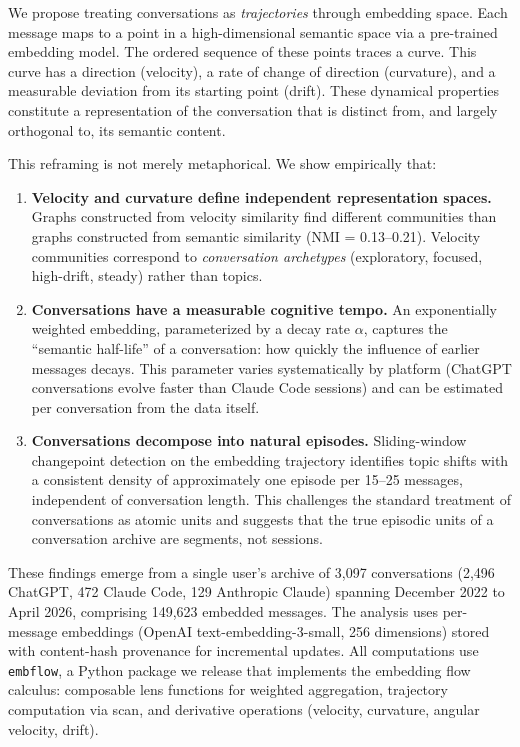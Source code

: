 \documentclass[11pt]{article}
\begin{document}
We propose treating conversations as \emph{trajectories} through embedding space. Each message maps to a point in a high-dimensional semantic space via a pre-trained embedding model. The ordered sequence of these points traces a curve. This curve has a direction (velocity), a rate of change of direction (curvature), and a measurable deviation from its starting point (drift). These dynamical properties constitute a representation of the conversation that is distinct from, and largely orthogonal to, its semantic content.

This reframing is not merely metaphorical. We show empirically that:

\begin{enumerate}
\item \textbf{Velocity and curvature define independent representation spaces.} Graphs constructed from velocity similarity find different communities than graphs constructed from semantic similarity (NMI = 0.13--0.21). Velocity communities correspond to \emph{conversation archetypes} (exploratory, focused, high-drift, steady) rather than topics.

\item \textbf{Conversations have a measurable cognitive tempo.} An exponentially weighted embedding, parameterized by a decay rate $\alpha$, captures the ``semantic half-life'' of a conversation: how quickly the influence of earlier messages decays. This parameter varies systematically by platform (ChatGPT conversations evolve faster than Claude Code sessions) and can be estimated per conversation from the data itself.

\item \textbf{Conversations decompose into natural episodes.} Sliding-window changepoint detection on the embedding trajectory identifies topic shifts with a consistent density of approximately one episode per 15--25 messages, independent of conversation length. This challenges the standard treatment of conversations as atomic units and suggests that the true episodic units of a conversation archive are segments, not sessions.
\end{enumerate}

These findings emerge from a single user's archive of 3,097 conversations (2,496 ChatGPT, 472 Claude Code, 129 Anthropic Claude) spanning December 2022 to April 2026, comprising 149,623 embedded messages. The analysis uses per-message embeddings (OpenAI text-embedding-3-small, 256 dimensions) stored with content-hash provenance for incremental updates. All computations use \texttt{embflow}, a Python package we release that implements the embedding flow calculus: composable lens functions for weighted aggregation, trajectory computation via scan, and derivative operations (velocity, curvature, angular velocity, drift).
\end{document}
